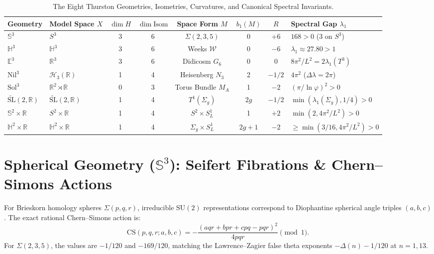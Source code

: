 \documentclass[11pt,a4paper]{article}
\begin{document}
\begin{table}[h!]
\centering
\small
\begin{tabular}{@{}llcccccl@{}}
\toprule
\textbf{Geometry} & \textbf{Model Space $X$} & $\dim H$ & $\dim \mathrm{Isom}$ & \textbf{Space Form $M$} & $b_1(M)$ & $R$ & \textbf{Spectral Gap $\lambda_1$} \\
\midrule
$\mathbb{S}^3$ & $S^3$ & 3 & 6 & $\Sigma(2,3,5)$ & 0 & $+6$ & $168 > 0$ ($3$ on $S^3$) \\
$\mathbb{H}^3$ & $\mathbb{H}^3$ & 3 & 6 & Weeks $\mathcal{W}$ & 0 & $-6$ & $\lambda_1 \approx 27.80 > 1$ \\
$\mathbb{E}^3$ & $\mathbb{R}^3$ & 3 & 6 & Didicosm $G_6$ & 0 & $0$ & $8\pi^2/L^2 = 2\lambda_1(T^3)$ \\
$\mathrm{Nil}^3$ & $\mathcal{H}_3(\mathbb{R})$ & 1 & 4 & Heisenberg $N_3$ & 2 & $-1/2$ & $4\pi^2$ ($\Delta\lambda = 2\pi$) \\
$\mathrm{Sol}^3$ & $\mathbb{R}^2 \rtimes \mathbb{R}$ & 0 & 3 & Torus Bundle $M_A$ & 1 & $-2$ & $(\pi/\ln\varphi)^2 > 0$ \\
$\widetilde{\mathrm{SL}}(2, \mathbb{R})$ & $\widetilde{\mathrm{SL}}(2, \mathbb{R})$ & 1 & 4 & $T^1(\Sigma_g)$ & $2g$ & $-1/2$ & $\min(\lambda_1(\Sigma_g), 1/4) > 0$ \\
$\mathbb{S}^2 \times \mathbb{R}$ & $S^2 \times \mathbb{R}$ & 1 & 4 & $S^2 \times S^1_L$ & 1 & $+2$ & $\min(2, 4\pi^2/L^2) > 0$ \\
$\mathbb{H}^2 \times \mathbb{R}$ & $\mathbb{H}^2 \times \mathbb{R}$ & 1 & 4 & $\Sigma_g \times S^1_L$ & $2g+1$ & $-2$ & $\ge \min(3/16, 4\pi^2/L^2) > 0$ \\
\bottomrule
\end{tabular}
\caption{The Eight Thurston Geometries, Isometries, Curvatures, and Canonical Spectral Invariants.}
\end{table}

\section{Spherical Geometry ($\mathbb{S}^3$): Seifert Fibrations \& Chern--Simons Actions}
For Brieskorn homology spheres $\Sigma(p,q,r)$, irreducible $\mathrm{SU}(2)$ representations correspond to Diophantine spherical angle triples $(a,b,c)$. The exact rational Chern--Simons action is:
\begin{equation}
\mathrm{CS}(p,q,r; a,b,c) = -\frac{(a q r + b p r + c p q - p q r)^2}{4 p q r} \pmod 1.
\end{equation}
For $\Sigma(2,3,5)$, the values are $-1/120$ and $-169/120$, matching the Lawrence--Zagier false theta exponents $-\Delta(n) - 1/120$ at $n = 1, 13$.
\end{document}
